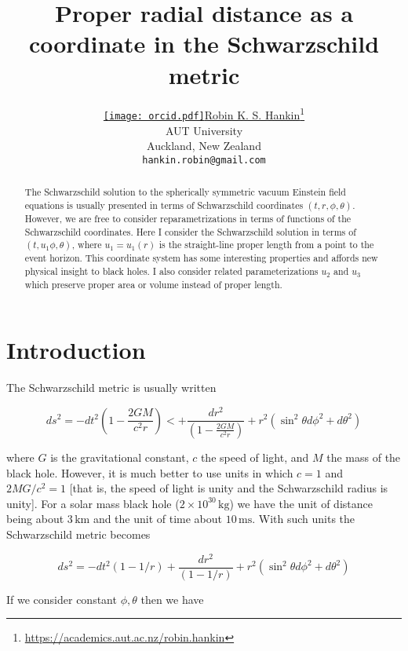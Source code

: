 \documentclass{article}
\title{Proper radial distance as a coordinate in the Schwarzschild metric}
\author{ \href{https://orcid.org/0000-0001-5982-0415}{\texttt{[image: orcid.pdf]}\hspace{1mm}Robin K. S. Hankin}\thanks{
\url{https://academics.aut.ac.nz/robin.hankin}}\\
              AUT University\\
              Auckland, New Zealand\\
	\texttt{hankin.robin@gmail.com} \\
}
\begin{document}
\maketitle

\begin{abstract}
The Schwarzschild solution to the spherically symmetric vacuum
Einstein field equations is usually presented in terms of
Schwarzschild coordinates $(t,r,\phi,\theta)$.  However, we are free
to consider reparametrizations in terms of functions of the
Schwarzschild coordinates.  Here I consider the Schwarzschild solution
in terms of $(t,u_1\phi,\theta)$, where $u_1=u_1(r)$ is the
straight-line proper length from a point to the event horizon.  This
coordinate system has some interesting properties and affords new
physical insight to black holes.  I also consider related
parameterizations $u_2$ and $u_3$ which preserve proper area or volume
instead of proper length.
\end{abstract}




\section{Introduction}
The Schwarzschild metric is usually written

\begin{equation}
  ds^2=-dt^2\left(1-\frac{2GM}{c^2r}\right)
<  +\frac{dr^2}{\left(1-\frac{2GM}{c^2r}\right)} + r^2(\sin^2\theta
  d\phi^2 + d\theta^2)
\end{equation}

where $G$ is the gravitational constant, $c$ the speed of light, and
$M$ the mass of the black hole.  However, it is much better to use
units in which $c=1$ and $2MG/c^2=1$ [that is, the speed of light is
  unity and the Schwarzschild radius is unity].  For a solar mass
black hole ($2\times 10^{30}\,\mathrm{kg}$) we have the unit of
distance being about $3\,\mathrm{km}$ and the unit of time about
$10\,\mathrm{ms}$.  With such units the Schwarzschild metric becomes

\begin{equation}
  ds^2=-dt^2\left(1-1/r\right)
  +\frac{dr^2}{\left(1-1/r\right)} + r^2(\sin^2\theta d\phi^2 + d\theta^2)
\end{equation}

If we consider constant $\phi,\theta$ then we have 

\label{sec:headings}
\end{document}
